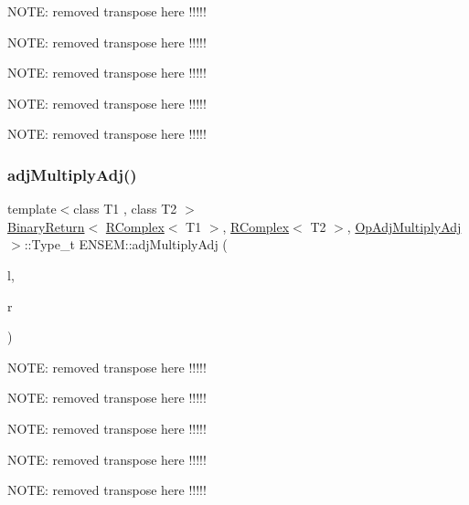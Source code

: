 N\+O\+TE\+: removed transpose here !!!!!

N\+O\+TE\+: removed transpose here !!!!!

N\+O\+TE\+: removed transpose here !!!!!

N\+O\+TE\+: removed transpose here !!!!!

N\+O\+TE\+: removed transpose here !!!!! \mbox{\label{group__rcomplex_gac9d1c7be9449dc3fbb0a17d63a51dc17}} 
\subsubsection{\texorpdfstring{adjMultiplyAdj()}{adjMultiplyAdj()}}
{\footnotesize\ttfamily template$<$class T1 , class T2 $>$ \\
\mbox{\hyperlink{structENSEM_1_1BinaryReturn}{Binary\+Return}}$<$ \mbox{\hyperlink{classENSEM_1_1RComplex}{R\+Complex}}$<$ T1 $>$, \mbox{\hyperlink{classENSEM_1_1RComplex}{R\+Complex}}$<$ T2 $>$, \mbox{\hyperlink{structENSEM_1_1OpAdjMultiplyAdj}{Op\+Adj\+Multiply\+Adj}} $>$\+::Type\+\_\+t E\+N\+S\+E\+M\+::adj\+Multiply\+Adj (\begin{DoxyParamCaption}\item[{const \mbox{\hyperlink{classENSEM_1_1RComplex}{R\+Complex}}$<$ T1 $>$ \&}]{l,  }\item[{const \mbox{\hyperlink{classENSEM_1_1RComplex}{R\+Complex}}$<$ T2 $>$ \&}]{r }\end{DoxyParamCaption})\hspace{0.3cm}{\ttfamily [inline]}}

N\+O\+TE\+: removed transpose here !!!!!

N\+O\+TE\+: removed transpose here !!!!!

N\+O\+TE\+: removed transpose here !!!!!

N\+O\+TE\+: removed transpose here !!!!!

N\+O\+TE\+: removed transpose here !!!!! \mbox{\label{group__rcomplex_gae6f982df6dd1eba378ad74676dc96bba}} 
